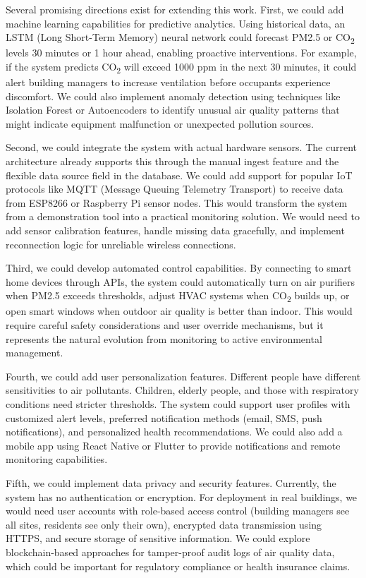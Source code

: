 \documentclass[12pt]{report}
\begin{document}
Several promising directions exist for extending this work. First, we could add machine learning capabilities for predictive analytics. Using historical data, an LSTM (Long Short-Term Memory) neural network could forecast PM2.5 or CO\textsubscript{2} levels 30 minutes or 1 hour ahead, enabling proactive interventions. For example, if the system predicts CO\textsubscript{2} will exceed 1000 ppm in the next 30 minutes, it could alert building managers to increase ventilation before occupants experience discomfort. We could also implement anomaly detection using techniques like Isolation Forest or Autoencoders to identify unusual air quality patterns that might indicate equipment malfunction or unexpected pollution sources.

Second, we could integrate the system with actual hardware sensors. The current architecture already supports this through the manual ingest feature and the flexible data source field in the database. We could add support for popular IoT protocols like MQTT (Message Queuing Telemetry Transport) to receive data from ESP8266 or Raspberry Pi sensor nodes. This would transform the system from a demonstration tool into a practical monitoring solution. We would need to add sensor calibration features, handle missing data gracefully, and implement reconnection logic for unreliable wireless connections.

Third, we could develop automated control capabilities. By connecting to smart home devices through APIs, the system could automatically turn on air purifiers when PM2.5 exceeds thresholds, adjust HVAC systems when CO\textsubscript{2} builds up, or open smart windows when outdoor air quality is better than indoor. This would require careful safety considerations and user override mechanisms, but it represents the natural evolution from monitoring to active environmental management.

Fourth, we could add user personalization features. Different people have different sensitivities to air pollutants. Children, elderly people, and those with respiratory conditions need stricter thresholds. The system could support user profiles with customized alert levels, preferred notification methods (email, SMS, push notifications), and personalized health recommendations. We could also add a mobile app using React Native or Flutter to provide notifications and remote monitoring capabilities.

Fifth, we could implement data privacy and security features. Currently, the system has no authentication or encryption. For deployment in real buildings, we would need user accounts with role-based access control (building managers see all sites, residents see only their own), encrypted data transmission using HTTPS, and secure storage of sensitive information. We could explore blockchain-based approaches for tamper-proof audit logs of air quality data, which could be important for regulatory compliance or health insurance claims.
\end{document}
